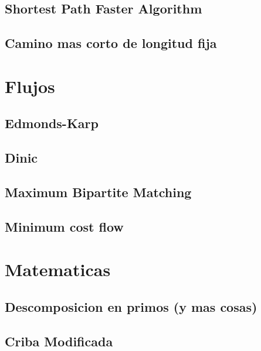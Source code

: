 \subsection{Shortest Path Faster Algorithm}
\raggedbottom
\hrulefill
\subsection{Camino mas corto de longitud fija}
\raggedbottom
\hrulefill

\section{Flujos}
\subsection{Edmonds-Karp}
\raggedbottom
\hrulefill
\subsection{Dinic}
\raggedbottom
\hrulefill
\subsection{Maximum Bipartite Matching}
\raggedbottom
\hrulefill
\subsection{Minimum cost flow}
\raggedbottom
\hrulefill

\section{Matematicas}
\subsection{Descomposicion en primos (y mas cosas)}
\raggedbottom
\hrulefill
\subsection{Criba Modificada}
\raggedbottom
\hrulefill
